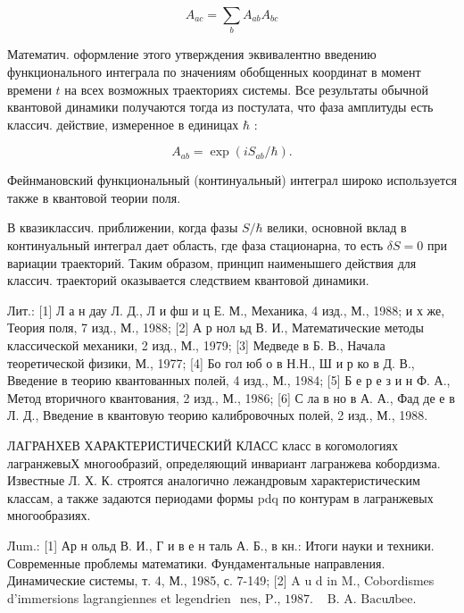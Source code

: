 \documentclass[10pt]{article}
\begin{document}
\[

A_{a c}=\sum_{b} A_{a b} A_{b c}

\]



Математич. оформление этого утверждения эквивалентно введению функционального интеграла по значениям обобщенных координат в момент времени $t$ на всех возможных траекториях системы. Все результаты обычной квантовой динамики получаются тогда из постулата, что фаза амплитуды есть классич. действие, измеренное в единицах $\hbar$ :



\[

A_{a b}=\exp \left(i S_{a b} / \hbar\right) .

\]



Фейнмановский функциональный (континуальный) интеграл широко используется также в квантовой теории поля.



В квазиклассич. приближении, когда фазы $S / \hbar$ велики, основной вклад в континуальный интеграл дает область, где фаза стационарна, то есть $\delta S=0$ при вариации траекторий. Таким образом, принцип наименышего действия для классич. траекторий оказывается следствием квантовой динамики.



Лит.: [1] Л а н дау Л. Д., Л и фш и ц Е. М., Механика, 4 изд., М., 1988; и х же, Теория поля, 7 изд., М., 1988; [2] А р нол ьд В. И., Математические методы классической механики, 2 изд., М., 1979; [3] Медведе в Б. В., Начала теоретической физики, М., 1977; [4] Бо гол юб о в Н.Н., Ш и р ко в Д. В., Введение в теорию квантованных полей, 4 изд., М., 1984; [5] Б е р е з и н Ф. А., Метод вторичного квантования, 2 изд., М., 1986; [6] С ла в но в А. А., Фад де е в Л. Д., Введение в квантовую теорию калибровочных полей, 2 изд., М., 1988.



ЛАГРАНХЕВ ХАРАКТЕРИСТИЧЕСКИЙ КЛАСС класс в когомологиях лагранжевыХ многообразий, определяющий инвариант лагранжева кобордизма. Известные Л. Х. К. строятся аналогично лежандровым характеристическим классам, а также задаются периодами формы pdq по контурам в лагранжевых многообразиях.



Лum.: [1] Ар н ольд В. И., Г и в е н таль А. Б., в кн.: Итоги науки и техники. Современные проблемы математики. Фундаментальные направления. Динамические системы, т. 4, М., 1985, с. 7-149; [2] A u d in M., Cobordismes d'immersions lagrangiennes et legendrien$\begin{array}{ll}\text { nes, P., } 1987 . & \text { B. A. Bacuлbee. }\end{array}$
\end{document}
